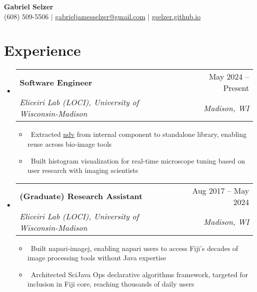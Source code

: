 \documentclass[letterpaper,10pt]{article}
\makeatletter
\newcommand{\resumeItem}[1]{\item\small{#1}}
\newcommand{\resumeSubheading}[4]{
\vspace{-1pt}\item
  \begin{tabular*}{0.97\textwidth}[t]{l@{\extracolsep{\fill}}r}
    \textbf{#1} & #2 \\
    \textit{#3} & \textit{#4} \\
  \end{tabular*}\vspace{-7pt}
}
\newcommand{\resumeSubHeadingList}{\begin{itemize}[leftmargin=0.15in, label={}]}
\newcommand{\resumeSubHeadingListEnd}{\end{itemize}}
\makeatother
\begin{document}
\begin{center}
  \textbf{\Huge Gabriel Selzer} \\
  \small (608) 509-5506 $|$ \href{mailto:gabrieljamesselzer@gmail.com}{gabrieljamesselzer@gmail.com} $|$ 
  \href{https://gselzer.github.io}{gselzer.github.io}
\end{center}



\section{Experience}
\resumeSubHeadingList
  \resumeSubheading
      {Software Engineer}{May 2024 -- Present}
      {Eliceiri Lab (LOCI), University of Wisconsin-Madison}{Madison, WI}
      \resumeSubHeadingList
          \resumeItem{\textbullet\ Extracted \href{https://pyapp-kit.github.io/ndv/latest/}{ndv} from internal component to standalone library, enabling reuse across bio-image tools}
          \resumeItem{\textbullet\ Built histogram visualization for real-time microscope tuning based on user research with imaging scientists}
      \resumeSubHeadingListEnd
  \resumeSubheading
      {(Graduate) Research Assistant}{Aug 2017 -- May 2024}
      {Eliceiri Lab (LOCI), University of Wisconsin-Madison}{Madison, WI}
      \resumeSubHeadingList
          \resumeItem{\textbullet\ Built napari-imagej, enabling napari users to access Fiji's decades of image processing tools without Java expertise}
          \resumeItem{\textbullet\ Architected SciJava Ops declarative algorithms framework, targeted for inclusion in Fiji core, reaching thousands of daily users}
      \resumeSubHeadingListEnd
\resumeSubHeadingListEnd
\end{document}

